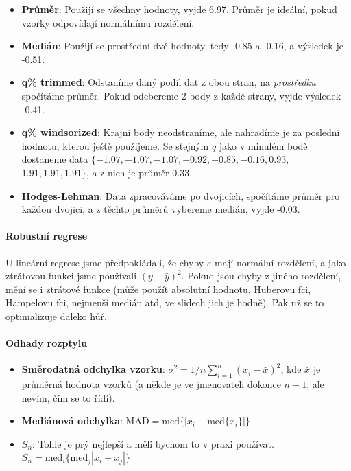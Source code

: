 \begin{itemize}
\item \textbf{Průměr}: Použijí se všechny hodnoty, vyjde 6.97. Průměr je ideální, pokud vzorky odpovídají normálnímu rozdělení.
\item \textbf{Medián}: Použijí se prostřední dvě hodnoty, tedy -0.85 a -0.16, a výsledek je -0.51.
\item \textbf{q\% trimmed}: Odstaníme daný podíl dat z obou stran, na \textit{prostředku} spočítáme průměr. Pokud odebereme 2 body z každé strany, vyjde výsledek -0.41.
\item \textbf{q\% windsorized}: Krajní body neodstraníme, ale nahradíme je za poslední hodnotu, kterou ještě použijeme. Se stejným $q$ jako v minulém bodě dostaneme data $\{-1.07, -1.07, -1.07, -0.92, -0.85, -0.16, 0.93,$ $1.91, 1.91, 1.91\}$, a z nich je průměr 0.33.
\item \textbf{Hodges-Lehman}: Data zpracováváme po dvojicích, spočítáme průměr pro každou dvojici, a z těchto průměrů vybereme medián, vyjde -0.03.
\end{itemize}

\paragraph{Robustní regrese} U lineární regrese jsme předpokládali, že chyby $\varepsilon$ mají normální rozdělení, a jako ztrátovou funkci jsme používali $(y-\bar{y})^2$. Pokud jsou chyby z jiného rozdělení, mění se i ztrátové funkce (může použít absolutní hodnotu, Huberovu fci, Hampelovu fci, nejmenší medián atd, ve slidech jich je hodně). Pak už se to optimalizuje daleko hůř.

\paragraph{Odhady rozptylu}
\begin{itemize}
\item \textbf{Směrodatná odchylka vzorku}: $\sigma^2 = 1/n\sum_{i=1}^n (x_i - \bar{x})^2$, kde $\bar{x}$ je průměrná hodnota vzorků (a někde je ve jmenovateli dokonce $n-1$, ale nevím, čím se to řídí).
\item \textbf{Mediánová odchylka}: $\text{MAD} = \text{med}\{|x_i - \text{med}\{x_i\}|\}$
\item $S_n$: Tohle je prý nejlepší a měli bychom to v praxi používat. $S_n = \text{med}_i \{\text{med}_j |x_i - x_j|\}$
\end{itemize}

